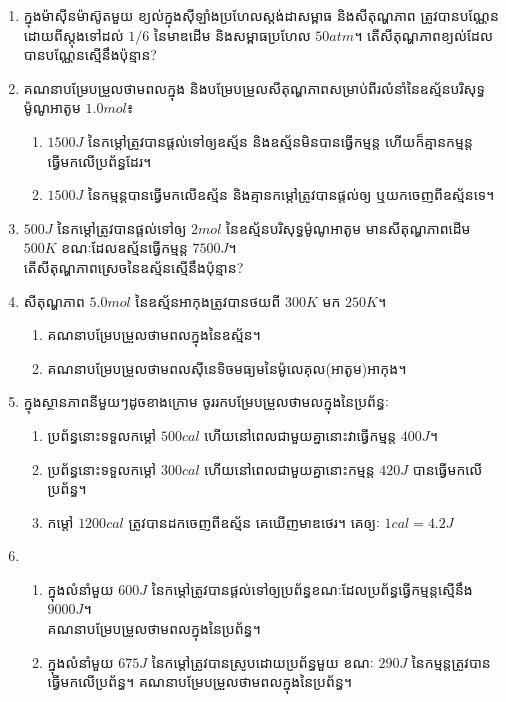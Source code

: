 \begin{enumerate}[m]
	\item ក្នុងម៉ាសុីនម៉ាស៊ូតមួយ ខ្យល់ក្នុងសុីឡាំងប្រហែលស្តង់ដាសម្ពាធ និងសីតុណ្ហភាព ត្រូវបានបណ្ណែនដោយពីស្តុងទៅដល់ $1/6$ នៃមាឌដើម និងសម្ពាធប្រហែល $50atm$។ តើសីតុណ្ហភាពខ្យល់ដែលបានបណ្ណែនស្មើនឹងប៉ុន្មាន?
	\item គណនាបម្រែបម្រួលថាមពលក្នុង និងបម្រែបម្រួលសីតុណ្ហភាពសម្រាប់ពីរលំនាំនៃឧស្ម័នបរិសុទ្ធម៉ូណូអាតូម $1.0mol$៖
	\begin{enumerate}[k]
		\item $1500J$ នៃកម្តៅត្រូវបានផ្តល់ទៅឲ្យឧស្ម័ន និងឧស្ម័នមិនបានធ្វើកម្មន្ត ហើយក៏គ្មានកម្មន្តធ្វើមកលើប្រព័ន្ធដែរ។
		\item $1500J$ នៃកម្មន្តបានធ្វើមកលើឧស្ម័ន និងគ្មានកម្តៅត្រូវបានផ្តល់ឲ្យ ឬយកចេញពីឧស្ម័នទេ។
	\end{enumerate}
	\item $500J$ នៃកម្តៅត្រូវបានផ្តល់ទៅឲ្យ $2mol$ នៃឧស្ម័នបរិសុទ្ធម៉ូណូអាតូម មានសីតុណ្ហភាពដើម $500K$ ខណៈដែលឧស្ម័នធ្វើកម្មន្ត $7500J$។\\ តើសីតុណ្ហភាពស្រេចនៃឧស្ម័នស្មើនឹងប៉ុន្មាន?
	\item សីតុណ្ហភាព $5.0mol$ នៃឧស្ម័នអាកុងត្រូវបានថយពី $300K$ មក $250K$។
	\begin{enumerate}[k]
		\item គណនាបម្រែបម្រួលថាមពលក្នុងនៃឧស្ម័ន។
		\item គណនាបម្រែបម្រួលថាមពលសុីនេទិចមធ្យមនៃម៉ូលេគុល(អាតូម)អាកុង។
	\end{enumerate}
	\item ក្នុងស្ថានភាពនីមួយៗដូចខាងក្រោម ចូររកបម្រែបម្រួលថាមលក្នុងនៃប្រព័ន្ធៈ
	\begin{enumerate}[k]
		\item ប្រព័ន្ធនោះទទួលកម្តៅ $500cal$ ហើយនៅពេលជាមួយគ្នានោះវាធ្វើកម្មន្ត $400J$។
		\item ប្រព័ន្ធនោះទទួលកម្តៅ $300cal$ ហើយនៅពេលជាមួយគ្នានោះកម្មន្ត $420J$ បានធ្វើមកលើប្រព័ន្ធ។
		\item កម្តៅ $1200cal$ ត្រូវបានដកចេញពីឧស្ម័ន គេឃើញមាឌថេរ។ គេឲ្យៈ $1cal=4.2J$ 
	\end{enumerate}
	\item \begin{enumerate}[k]
		\item ក្នុងលំនាំមួយ $600J$ នៃកម្តៅត្រូវបានផ្តល់ទៅឲ្យប្រព័ន្ធខណៈដែលប្រព័ន្ធធ្វើកម្មន្តស្មើនឹង $9000J$។\\ គណនាបម្រែបម្រួលថាមពលក្នុងនៃប្រព័ន្ធ។
		\item ក្នុងលំនាំមួយ $675J$ នៃកម្តៅត្រូវបានស្រូបដោយប្រព័ន្ធមួយ ខណៈ $290J$  នៃកម្មន្តត្រូវបានធ្វើមកលើប្រព័ន្ធ។ គណនាបម្រែបម្រួលថាមពលក្នុងនៃប្រព័ន្ធ។
	\end{enumerate}

\end{enumerate}
